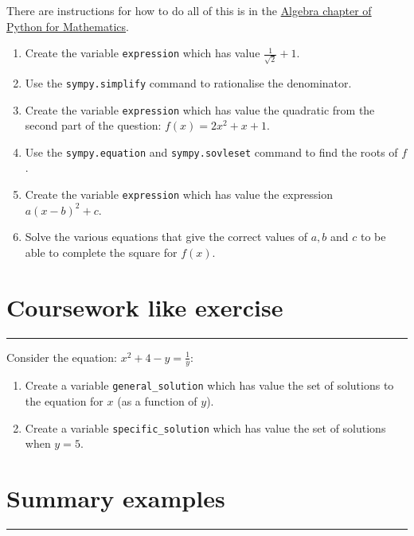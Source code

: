 \documentclass{article}
\begin{document}
There are instructions for how to do all of this is in the
\href{https://vknight.org/pfm/tools-for-mathematics/02-algebra/how/main.html}{Algebra chapter of Python for Mathematics}.


\begin{enumerate}
\item
  Create the variable \texttt{expression} which has value
        $\frac{1}{\sqrt{2}} + 1$.
\item Use the \texttt{sympy.simplify} command to rationalise the
        denominator.
\item Create the variable \texttt{expression} which has value the
        quadratic from the second part of the question: $f(x) = 2x^ 2 + x + 1$.
\item Use the \texttt{sympy.equation} and
        \texttt{sympy.sovleset} command to find the roots of $f$.
\item Create the variable \texttt{expression} which has value the
        expression $a(x-b) ^ 2 + c$.
\item Solve the various equations that give the correct values of $a, b$ and
    $c$ to be able to complete the square for $f(x)$.
\end{enumerate}


\section{Coursework like exercise}
\hrule


Consider the equation: $x ^ 2 + 4 - y = \frac{1}{y}$:

\begin{enumerate}
    \item Create a variable \texttt{general_solution} which has value the set of solutions to
   the equation for $x$ (as a function of $y$).
\item Create a variable \texttt{specific_solution} which has value the set of solutions when $y = 5$. 
\end{enumerate}

\section{Summary examples}
\hrule
\end{document}
